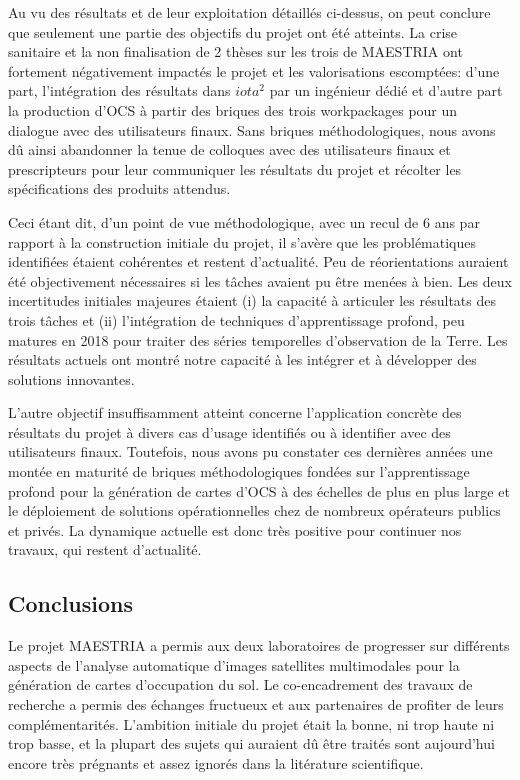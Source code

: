Au vu des résultats et de leur exploitation détaillés ci-dessus, on peut conclure que seulement une partie des objectifs du projet ont été atteints. La crise sanitaire et la non finalisation de 2 thèses sur les trois de MAESTRIA ont fortement négativement impactés le projet et les valorisations escomptées: d'une part, l'intégration des résultats dans $iota^2$ par un ingénieur dédié et d'autre part la production d'OCS à partir des briques des trois workpackages pour un dialogue avec des utilisateurs finaux. Sans briques méthodologiques, nous avons dû ainsi abandonner la tenue de colloques avec des utilisateurs finaux et prescripteurs pour leur communiquer les résultats du projet et récolter les spécifications des produits attendus. 

Ceci étant dit, d'un point de vue méthodologique, avec un recul de 6 ans par rapport à la construction initiale du projet, il s'avère que les problématiques identifiées étaient cohérentes et restent d'actualité. Peu de réorientations auraient été objectivement nécessaires si les tâches avaient pu être menées à bien. Les deux incertitudes initiales majeures étaient (i) la capacité à articuler les résultats des trois tâches et (ii) l'intégration de techniques d'apprentissage profond, peu matures en 2018 pour traiter des séries temporelles d'observation de la Terre. Les résultats actuels ont montré notre capacité à les intégrer et à développer des solutions innovantes.

L’autre objectif insuffisamment atteint concerne l’application concrète des résultats du projet à divers cas d’usage identifiés ou à identifier avec des utilisateurs finaux. Toutefois, nous avons pu constater ces dernières années une montée en maturité de briques méthodologiques fondées sur l'apprentissage profond pour la génération de cartes d'OCS à des échelles de plus en plus large et le déploiement de solutions opérationnelles chez de nombreux opérateurs publics et privés. La dynamique actuelle est donc très positive pour continuer nos travaux, qui restent d'actualité.

\subsection{Conclusions}
Le projet MAESTRIA a permis aux deux laboratoires de progresser sur différents aspects de l'analyse automatique d'images satellites multimodales pour la génération de cartes d'occupation du sol. Le co-encadrement des travaux de recherche a permis des échanges fructueux et aux partenaires de profiter de leurs complémentarités. L'ambition initiale du projet était la bonne, ni trop haute ni trop basse, et la plupart des sujets qui auraient dû être traités sont aujourd'hui encore très prégnants et assez ignorés dans la litérature scientifique.


